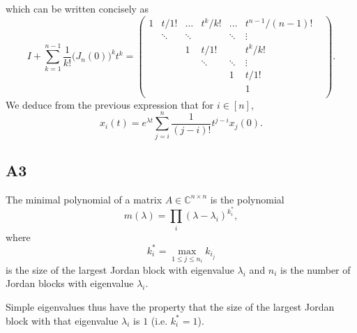 \documentclass[11pt]{article}
\newcommand{\complex}{\mathbb{C}} %
\begin{document}
which can be written concisely as
\[
    I+\sum_{k=1}^{n-1}\frac{1}{k!}\big(J_n(0)\big)^k t^k=
    \begin{pmatrix}
    1 & t/1! & \dots & t^k/k! & \dots & t^{n-1}/(n-1)!\\
      & \ddots & \ddots &  & \ddots & \vdots\\
      & & 1 & t/1! & & t^k/k! &\\
      & & & \ddots & \ddots & \vdots\\
      & & & & 1 & t/1!\\
      & & & & & 1\\
    \end{pmatrix}.
\]
We deduce from the previous expression that for $i\in [n]$,
\begin{equation*}
    x_i(t)=e^{\lambda t} \sum^{n}_{j=i} \frac{1}{(j-i)!}t^{j-i}x_j(0).
\end{equation*}

\subsection*{A3}
The minimal polynomial of a matrix \(A \in \complex^{n \times n}\) is the polynomial
\[
m(\lambda) = \prod_i (\lambda - \lambda_i)^{k_i^*},
\]
where
\[
k_i^* = \max_{1 \leqslant j \leqslant n_i} k_{i_j}
\]
is the size of the largest Jordan block with eigenvalue \(\lambda_i\) and \(n_i\) is the number of Jordan blocks with eigenvalue \(\lambda_i\).

Simple eigenvalues thus have the property that the size of the largest Jordan block with that eigenvalue \(\lambda_i\) is \(1\) (i.e. \(k_i^* = 1\)).
\end{document}
